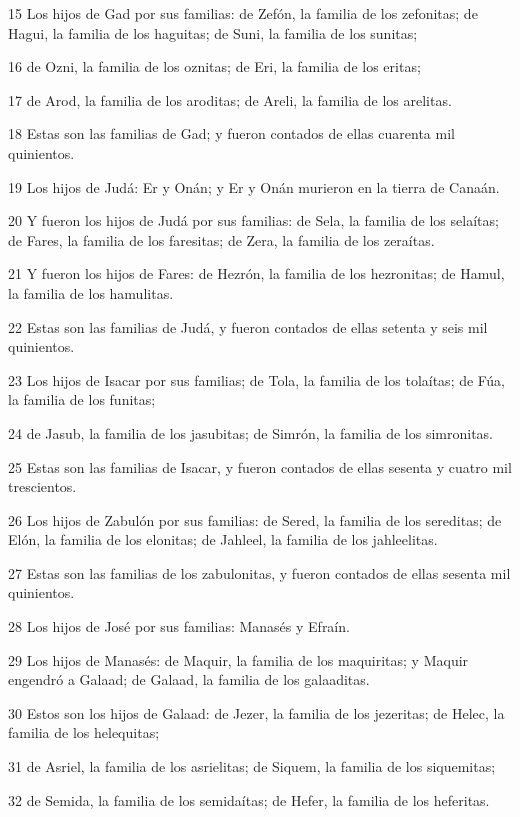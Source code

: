 \par 15 Los hijos de Gad por sus familias: de Zefón, la familia de los zefonitas; de Hagui, la familia de los haguitas; de Suni, la familia de los sunitas;
\par 16 de Ozni, la familia de los oznitas; de Eri, la familia de los eritas;
\par 17 de Arod, la familia de los aroditas; de Areli, la familia de los arelitas.
\par 18 Estas son las familias de Gad; y fueron contados de ellas cuarenta mil quinientos.
\par 19 Los hijos de Judá: Er y Onán; y Er y Onán murieron en la tierra de Canaán.
\par 20 Y fueron los hijos de Judá por sus familias: de Sela, la familia de los selaítas; de Fares, la familia de los faresitas; de Zera, la familia de los zeraítas.
\par 21 Y fueron los hijos de Fares: de Hezrón, la familia de los hezronitas; de Hamul, la familia de los hamulitas.
\par 22 Estas son las familias de Judá, y fueron contados de ellas setenta y seis mil quinientos.
\par 23 Los hijos de Isacar por sus familias; de Tola, la familia de los tolaítas; de Fúa, la familia de los funitas;
\par 24 de Jasub, la familia de los jasubitas; de Simrón, la familia de los simronitas.
\par 25 Estas son las familias de Isacar, y fueron contados de ellas sesenta y cuatro mil trescientos.
\par 26 Los hijos de Zabulón por sus familias: de Sered, la familia de los sereditas; de Elón, la familia de los elonitas; de Jahleel, la familia de los jahleelitas.
\par 27 Estas son las familias de los zabulonitas, y fueron contados de ellas sesenta mil quinientos.
\par 28 Los hijos de José por sus familias: Manasés y Efraín.
\par 29 Los hijos de Manasés: de Maquir, la familia de los maquiritas; y Maquir engendró a Galaad; de Galaad, la familia de los galaaditas.
\par 30 Estos son los hijos de Galaad: de Jezer, la familia de los jezeritas; de Helec, la familia de los helequitas;
\par 31 de Asriel, la familia de los asrielitas; de Siquem, la familia de los siquemitas;
\par 32 de Semida, la familia de los semidaítas; de Hefer, la familia de los heferitas.
